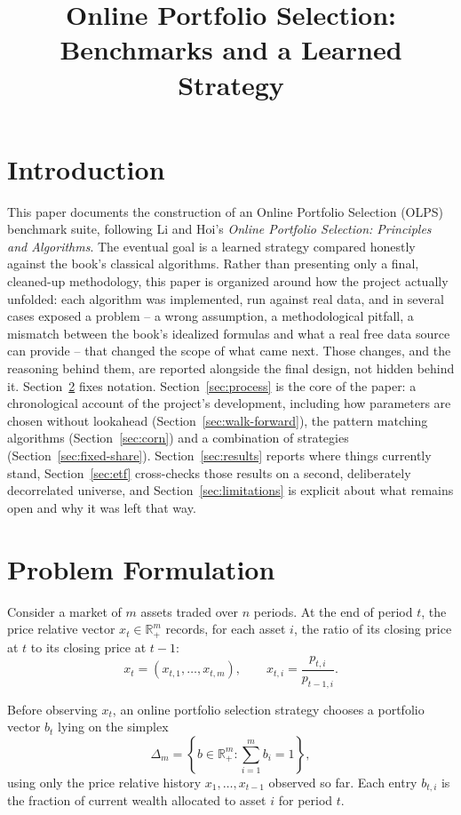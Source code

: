 \documentclass[11pt]{article}
\title{Online Portfolio Selection: Benchmarks and a Learned Strategy}
\author{}
\date{}
\begin{document}
\maketitle

\section{Introduction}

This paper documents the construction of an Online Portfolio Selection
(OLPS) benchmark suite, following Li and Hoi's \emph{Online Portfolio
Selection: Principles and Algorithms}. The eventual goal is a learned
strategy compared honestly against the book's classical algorithms. Rather
than presenting only a final, cleaned-up methodology, this paper is
organized around how the project actually unfolded: each algorithm was
implemented, run against real data, and in several cases exposed a problem
-- a wrong assumption, a methodological pitfall, a mismatch between the
book's idealized formulas and what a real free data source can provide --
that changed the scope of what came next. Those changes, and the reasoning
behind them, are reported alongside the final design, not hidden behind it.
Section~\ref{sec:formulation} fixes notation. Section~\ref{sec:process}
is the core of the paper: a chronological account of the project's
development, including how parameters are chosen without lookahead
(Section~\ref{sec:walk-forward}), the pattern matching algorithms
(Section~\ref{sec:corn}) and a combination of strategies
(Section~\ref{sec:fixed-share}). Section~\ref{sec:results} reports where things currently
stand, Section~\ref{sec:etf} cross-checks those results on a second,
deliberately decorrelated universe, and Section~\ref{sec:limitations} is
explicit about what remains open and why it was left that way.

\section{Problem Formulation}
\label{sec:formulation}

Consider a market of $m$ assets traded over $n$ periods. At the end of
period $t$, the price relative vector $x_t \in \mathbb{R}^m_{+}$ records,
for each asset $i$, the ratio of its closing price at $t$ to its closing
price at $t-1$:
\[
    x_t = (x_{t,1}, \dots, x_{t,m}), \qquad
    x_{t,i} = \frac{p_{t,i}}{p_{t-1,i}}.
\]

Before observing $x_t$, an online portfolio selection strategy chooses a
portfolio vector $b_t$ lying on the simplex
\[
    \Delta_m = \left\{ b \in \mathbb{R}^m_{+} : \sum_{i=1}^m b_i = 1 \right\},
\]
using only the price relative history $x_1, \dots, x_{t-1}$ observed so
far. Each entry $b_{t,i}$ is the fraction of current wealth allocated to
asset $i$ for period $t$.
\end{document}
